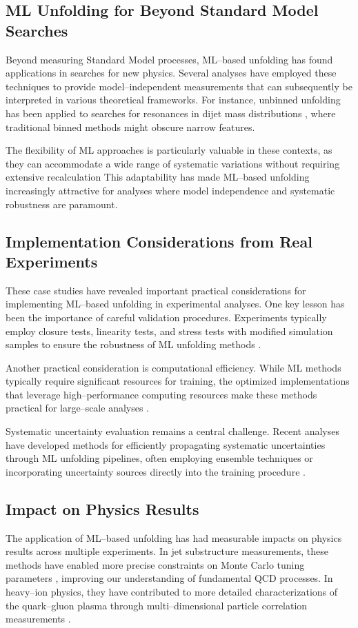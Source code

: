 \subsection{ML Unfolding for Beyond Standard Model Searches}
    Beyond measuring Standard Model processes, ML--based unfolding has found applications in searches for new physics.
    Several analyses have employed these techniques to provide model--independent measurements that can subsequently be interpreted in various theoretical frameworks.
    For instance, unbinned unfolding has been applied to searches for resonances in dijet mass distributions , where traditional binned methods might obscure narrow features.

    The flexibility of ML approaches is particularly valuable in these contexts, as they can accommodate a wide range of systematic variations without requiring extensive recalculation
    This adaptability has made ML--based unfolding increasingly attractive for analyses where model independence and systematic robustness are paramount.
    
\subsection{Implementation Considerations from Real Experiments}
    These case studies have revealed important practical considerations for implementing ML--based unfolding in experimental analyses.
    One key lesson has been the importance of careful validation procedures.
    Experiments typically employ closure tests, linearity tests, and stress tests with modified simulation samples to ensure the robustness of ML unfolding methods .

    Another practical consideration is computational efficiency.
    While ML methods typically require significant resources for training, the optimized implementations that leverage high--performance computing resources make these methods practical for large--scale analyses .

    Systematic uncertainty evaluation remains a central challenge. Recent analyses have developed methods for efficiently propagating systematic uncertainties through ML unfolding pipelines, often employing ensemble techniques or incorporating uncertainty sources directly into the training procedure .

\subsection{Impact on Physics Results}
    The application of ML--based unfolding has had measurable impacts on physics results across multiple experiments.
    In jet substructure measurements, these methods have enabled more precise constraints on Monte Carlo tuning parameters , improving our understanding of fundamental QCD processes.
    In heavy--ion physics, they have contributed to more detailed characterizations of the quark--gluon plasma through multi--dimensional particle correlation measurements .


